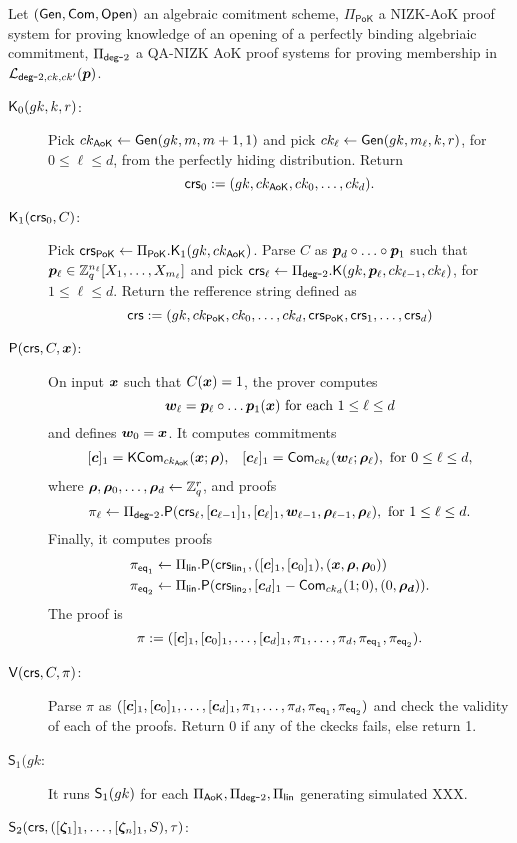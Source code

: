
Let $(\mathsf{Gen},\mathsf{Com},\mathsf{Open})$ an algebraic comitment scheme, $\Pi_\mathsf{PoK}$ a NIZK-AoK proof system for proving knowledge of an opening of a perfectly binding algebriaic commitment, $\Pi_{\mathsf{deg}\mbox{-}2}$ a QA-NIZK AoK proof systems for proving membership in $\mathcal{L}_{{\mathsf{deg}\mbox{-}2},ck,ck'}({\boldsymbol{p}})$.
\begin{description}
\item[{$\mathsf{K}_0(gk,k, r)$}:]
Pick $ck_\mathsf{AoK}\gets\mathsf{Gen}(gk,m,m+1,1)$ and pick $ck_\ell\gets\mathsf{Gen}(gk,m_\ell,k,r)$, for $0\leq\ell\leq d$,  from the perfectly hiding distribution. Return
$$
\mathsf{crs}_0 := (gk,ck_\mathsf{AoK},ck_0,\ldots,ck_d).
$$
\item[{$\mathsf{K}_1(\mathsf{crs}_0, C)$}:] %
Pick  $\mathsf{crs}_\mathsf{PoK}\gets \Pi_\mathsf{PoK}.\mathsf{K}_1(gk,ck_\mathsf{AoK})$. Parse $C$ as ${\boldsymbol{p}}_d\circ\ldots\circ{\boldsymbol{p}}_1$ such that ${\boldsymbol{p}}_\ell\in\mathbb{Z}_q^{n_\ell}[X_1,\ldots,X_{m_\ell}]$ and pick $\mathsf{crs}_\ell\gets\Pi_{\mathsf{deg}\mbox{-}2}.\mathsf{K}(gk,{\boldsymbol{p}}_\ell,ck_{\ell-1},ck_\ell)$, for $1\leq\ell\leq d$. Return the refference string defined as $$\mathsf{crs} := (gk,ck_\mathsf{PoK},ck_0,\ldots,ck_{d},\mathsf{crs}_\mathsf{PoK},\mathsf{crs}_1,\ldots,\mathsf{crs}_d)$$

\item[{$\mathsf{P}(\mathsf{crs}, C, {\boldsymbol{x}})$}:]
On input ${\boldsymbol{x}}$ such that $C({\boldsymbol{x}})=1$, the prover computes
$$
{\boldsymbol{w}}_\ell = {\boldsymbol{p}}_\ell\circ \ldots {\boldsymbol{p}}_1({\boldsymbol{x}}) \text{ for each } 1\leq \ell\leq d
$$
and defines ${\boldsymbol{w}}_0={\boldsymbol{x}}$.
It computes commitments
\begin{align*}
&[{\boldsymbol{c}}]_1 = \mathsf{KCom}_{ck_\mathsf{AoK}}({\boldsymbol{x}};{\boldsymbol{\rho}}),
&[{\boldsymbol{c}}_\ell]_1 = \mathsf{Com}_{ck_\ell}({\boldsymbol{w}}_\ell;{\boldsymbol{\rho}}_\ell), \text{ for } 0\leq\ell\leq d,
\end{align*}
where ${\boldsymbol{\rho}},{\boldsymbol{\rho}}_0,\ldots,{\boldsymbol{\rho}}_d\gets\mathbb{Z}_q^r$, and proofs
$$\pi_\ell\gets\Pi_{\mathsf{deg}\mbox{-}2}.\mathsf{P}(\mathsf{crs}_\ell,[{\boldsymbol{c}}_{\ell-1}]_1,[{\boldsymbol{c}}_\ell]_1,{\boldsymbol{w}}_{\ell-1},{\boldsymbol{\rho}}_{\ell-1},{\boldsymbol{\rho}}_\ell),\text{ for } 1\leq\ell\leq d.$$
Finally, it computes proofs
\begin{align*}
&\pi_{\mathsf{eq}_1} \gets \Pi_{\mathsf{lin}}.\mathsf{P}(\mathsf{crs}_{\mathsf{lin}_1}, ([{\boldsymbol{c}}]_1,[{\boldsymbol{c}}_0]_1),({\boldsymbol{x}},{\boldsymbol{\rho}},{\boldsymbol{\rho}}_0))\\
&\pi_{\mathsf{eq}_2} \gets \Pi_{\mathsf{lin}}.\mathsf{P}(\mathsf{crs}_{\mathsf{lin}_2}, [{\boldsymbol{c}}_d]_1-\mathsf{Com}_{ck_d}(1;0),(0,{\boldsymbol{\rho_d}})).
\end{align*}
The proof is
$$\pi:=([{\boldsymbol{c}}]_1,[{\boldsymbol{c}}_0]_1,\ldots,[{\boldsymbol{c}}_d]_1,\pi_1,\ldots,\pi_d,\pi_{\mathsf{eq}_1},\pi_{\mathsf{eq}_2}).$$
\item[{\(\mathsf{V}(\mathsf{crs},C,\pi)\)}:]
Parse $\pi$ as $([{\boldsymbol{c}}]_1,[{\boldsymbol{c}}_0]_1,\ldots,[{\boldsymbol{c}}_d]_1,\pi_1,\ldots,\pi_d,\pi_{\mathsf{eq}_1},\pi_{\mathsf{eq}_2})$ and check the validity of each of the proofs. Return 0 if any of the ckecks fails, else return 1.

\item[{\(\mathsf{S}_1({gk}\):}] It runs $\mathsf{S}_1(gk)$ for each $\Pi_\mathsf{AoK},\Pi_{\mathsf{deg}\mbox{-}2},\Pi_{\mathsf{lin}}$ generating simulated XXX.

\item[{\(\mathsf{S}_2(\mathsf{crs},([{\boldsymbol \zeta}_1]_1,\ldots,[{\boldsymbol \zeta}_n]_1,S),\tau)\):}] 
\end{description}

